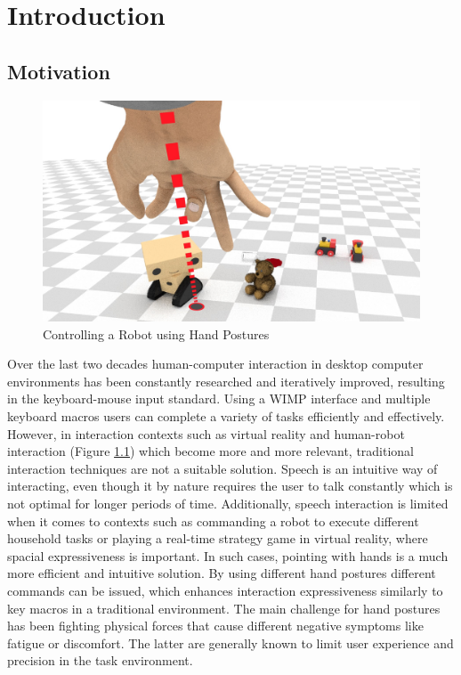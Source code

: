 
\chapter{Introduction}\label{chapter:introduction}

\section{Motivation}

\begin{figure}[h]
\centering
\includegraphics[width=\textwidth]{Robot}
\caption{Controlling a Robot using Hand Postures}
\label{fig:Robot}
\end{figure}

Over the last two decades human-computer interaction in desktop computer environments has been constantly researched and iteratively improved, resulting in the keyboard-mouse input standard. Using a WIMP interface and multiple keyboard macros users can complete a variety of tasks efficiently and effectively.
However, in interaction contexts such as virtual reality and human-robot interaction (Figure \ref{fig:Robot}) which become more and more relevant, traditional interaction techniques are not a suitable solution. Speech is an intuitive way of interacting, even though it by nature requires the user to talk constantly which is not optimal for longer periods of time. Additionally, speech interaction is limited when it comes to contexts such as commanding a robot to execute different household tasks or playing a real-time strategy game in virtual reality, where spacial expressiveness is important. In such cases, pointing with hands is a much more efficient and intuitive solution. By using different hand postures different commands can be issued, which enhances interaction expressiveness similarly to key macros in a traditional environment.
The main challenge for hand postures has been fighting physical forces that cause different negative symptoms like fatigue or discomfort. The latter are generally known to limit user experience and precision \cite{short1999precision} in the task environment.

